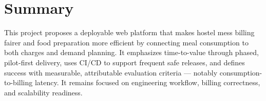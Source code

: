 \documentclass[12pt,a4paper]{article}
\begin{document}
\section{Summary}

This project proposes a deployable web platform that makes hostel mess billing
fairer and food preparation more efficient by connecting meal consumption to
both charges and demand planning. It emphasizes time-to-value through phased,
pilot-first delivery, uses CI/CD to support frequent safe releases, and
defines success with measurable, attributable evaluation criteria --- notably
consumption-to-billing latency. It remains focused on engineering workflow,
billing correctness, and scalability readiness.
\end{document}
